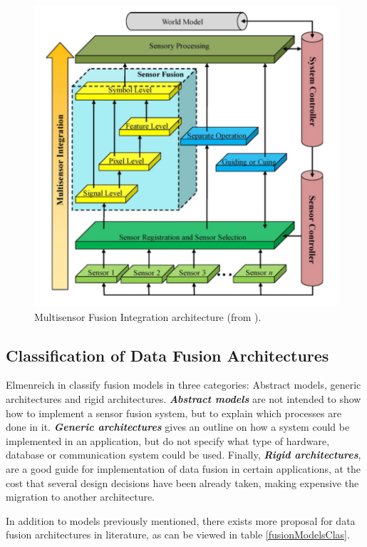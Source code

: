 \begin{figure}[ht!]
\centering
\includegraphics[scale=0.5]{fig/2/MFIArch.png}
\caption{Multisensor Fusion Integration architecture (from \cite{Luo2011}).}
\label{MFIArch}
\end{figure}

\subsection{Classification of Data Fusion Architectures}


Elmenreich in \cite{Elmenreich2007} classify fusion models in three categories: Abstract models, generic architectures and rigid architectures. \textbf{\textit{Abstract models}} are not intended to show how to implement a sensor fusion system, but to explain which processes are done in it. \textbf{\textit{Generic architectures}} gives an outline on how a system could be implemented in an application, but do not specify what type of hardware, database or communication system could be used. Finally, \textbf{\textit{Rigid architectures}}, are a good guide for implementation  of data fusion in certain applications, at the cost that several design decisions have been already taken, making expensive the migration to another architecture. 

In addition to models previously mentioned, there exists more proposal for data fusion architectures in literature, as can be viewed in table \ref{fusionModelsClas}.

